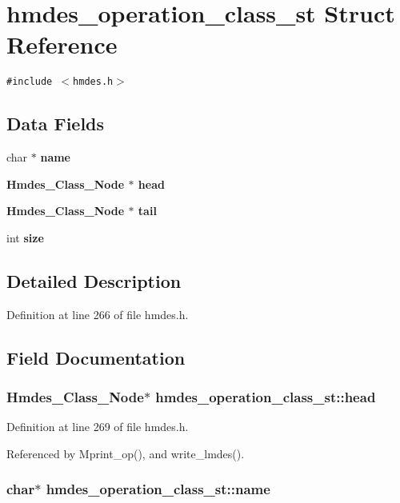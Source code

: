 \section{hmdes\_\-operation\_\-class\_\-st Struct Reference}
\label{structhmdes__operation__class__st}
{\tt \#include $<$hmdes.h$>$}

\subsection*{Data Fields}
\begin{CompactItemize}
\item 
char $\ast$ \bf{name}
\item 
\bf{Hmdes\_\-Class\_\-Node} $\ast$ \bf{head}
\item 
\bf{Hmdes\_\-Class\_\-Node} $\ast$ \bf{tail}
\item 
int \bf{size}
\end{CompactItemize}


\subsection{Detailed Description}




Definition at line 266 of file hmdes.h.

\subsection{Field Documentation}
\subsubsection{\setlength{\rightskip}{0pt plus 5cm}\bf{Hmdes\_\-Class\_\-Node}$\ast$ \bf{hmdes\_\-operation\_\-class\_\-st::head}}\label{structhmdes__operation__class__st_48cad0fcb2f2e4e4aae44ddd577dc8a5}




Definition at line 269 of file hmdes.h.

Referenced by Mprint\_\-op(), and write\_\-lmdes().
\subsubsection{\setlength{\rightskip}{0pt plus 5cm}char$\ast$ \bf{hmdes\_\-operation\_\-class\_\-st::name}}\label{structhmdes__operation__class__st_c790e71195282a26761ce542ac870062}




